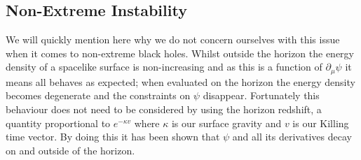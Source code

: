 \documentclass[12pt]{article}
\numberwithin{equation}{section}
\numberwithin{figure}{section}
\begin{document}
\subsection{Non-Extreme Instability} %
\label{sub:non_extreme_instability}
We will quickly mention here why we do not concern ourselves with this issue when it comes to non-extreme black holes. Whilst outside the horizon the energy density of a spacelike surface is non-increasing and as this is a function of $\partial_{\mu}\psi$ it means all behaves as expected; when evaluated on the horizon the energy density becomes degenerate and the constraints on $\psi$ disappear. Fortunately this behaviour does not need to be considered by using the horizon redshift, a quantity proportional to $e^{-\kappa v}$ where $\kappa$ is our surface gravity and $v$ is our Killing time vector. By doing this it has been shown that $\psi$ and all its derivatives decay on and outside of the horizon.
\end{document}
